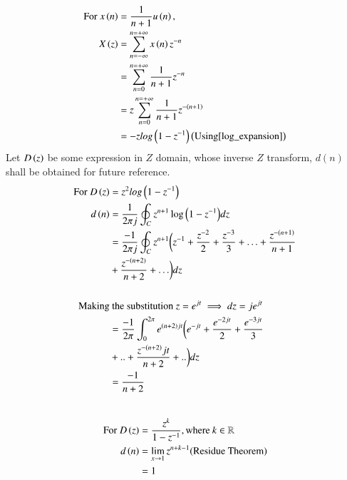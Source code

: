 \documentclass[journal,12pt,twocolumn]{IEEEtran}
\theoremstyle{remark}
\begin{document}
\begin{align}
	\notag \text{For } x\left(n\right) &= \frac{1}{n+1}u\left(n\right),\\
	X\left(z\right) &=\sum_{n= -\infty}^{n= +\infty} x\left(n\right)z^{-n}\\
	&= \sum_{n = 0}^{n = +\infty} \frac{1}{n+1}z^{-n}\\
	&= z\sum_{n = 0}^{n = +\infty} \frac{1}{n+1}z^{-\left(n+1\right)} \\
	&= -zlog\left(1-z^{-1}\right) \left(\text{Using} \eqref{log_expansion}\right) \label{When_c_equals_1}	
\end{align}
\newpage
Let $D\left(z\right)$ be some expression in $Z$ domain, whose inverse $Z$ transform, $d(n)$ shall be obtained for future reference.\\
\begin{align}
    \notag\text{For }D\left(z\right) &= z^{2}log\left(1-z^{-1}\right)\\
    d\left(n\right)&=\frac{1}{2\pi j} \oint _C z^{n+1}\log{\ensuremath{\left(1-z^{-1}\right)}}dz\\
    &=\frac{-1}{2\pi j} \oint _C z^{n+1}\biggl(z^{-1}+\frac{z^{-2}}{2} + \frac{z^{-3}}{3}+\ldots + \frac{z^{-(n+1)}}{n+1} \notag\\ \;\: &+  \frac{z^{-\left(n+2\right)}}{n+2}+ \ldots \biggr) dz\\ 
\notag \\   
\notag\text{Making}&\text{ the substitution }z=e^{jt} \implies dz = je^{jt}\\
    &=\frac{-1}{2\pi} \int_{0}^{2\pi} e^{\left(n+2\right)jt}\biggl(e^{-jt}+\frac{e^{-2jt}}{2} + \frac{e^{-3jt}}{3} \notag \\&+.. +\frac{z^{-\left(n+2\right)}jt}{n+2}+..\biggr) dz\\
    &=\frac{-1}{n+2}\label{11027_eq2}
\end{align}
\\
\begin{align}
    \notag \text{For }D\left(z\right)&= \frac{z^k}{1-z^{-1}},\text{where} \: k \in \mathbb{R}\\
    d\left(n\right)&= \lim_{x \to 1}z^{n+k-1} \text{(Residue Theorem)}\\
    &= 1\label{11027_eq3}
\end{align}
\end{document}
